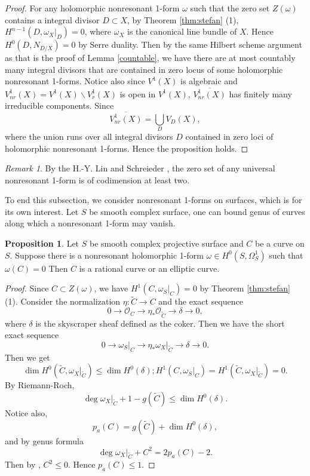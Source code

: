 \documentclass[a4paper,12pt,reqno]{amsart}
\theoremstyle{plain}
\theoremstyle{definition}
\newtheorem{proposition}[theorem]{Proposition}
\theoremstyle{remark}
\newtheorem{remark}[theorem]{Remark}
\begin{document}
 \begin{proof}
For any holomorphic nonresonant 1-form $\omega$ such that the zero set $Z(\omega)$ contains a integral divisor $D\subset X$, by Theorem \ref{thm:stefan} (1), $H^{n-1}(D, {\omega_X}|_D)=0$, where $\omega_X$ is the canonical line bundle of $X$. Hence $H^0(D, N_{D/X})=0$ by Serre duality. Then by the same Hilbert scheme argument as that is the proof of   Lemma \ref{countable}, we have there are at most countably many integral divisors that are contained in zero locus of some holomorphic nonresonant 1-forms.  Notice also since $V^1(X)$ is algebraic and $V^1_{nr}(X)=V^1(X)\backslash V_r^1(X)$ is open in $V^1(X)$, $\overline{V_{nr}^1(X)}$ has finitely many irreducible components. Since $$\overline{V_{nr}^1(X)}=\bigcup_{D}V_D(X),$$ where the union runs over all integral divisors $D$ contained in zero loci of holomorphic nonresonant 1-forms. Hence the proposition holds.
 \end{proof}
 
 \begin{remark}
By the H.-Y. Lin and Schreieder \cite[appendix]{SS19}, the zero set of any universal nonresonant 1-form is of codimension at least two. 
 \end{remark}

 To end this subsection, we consider nonresonant 1-forms on surfaces, which is for its own interest. Let $S$ be smooth complex surface, one can bound genus of curves along which a nonresonant 1-form may vanish.
 
 \begin{proposition}
 Let $S$ be smooth complex projective surface and $C$ be a curve on $S$. Suppose there is a nonresonant holomorphic 1-form $\omega\in H^0(S, \Omega_S^1)$ such that $\omega(C)=0$ Then $C$ is a rational curve or an elliptic curve.
 \end{proposition}
 
 
 \begin{proof}
 Since $C\subset Z(\omega)$, we have $H^1(C, {\omega_S}|_C)=0$ by Theorem \ref{thm:stefan} (1). Consider the normalization $\eta: \widetilde{C}\to C$ and the exact sequence $$0\to \mathcal{O}_C\to \eta_*\mathcal{O}_{\widetilde{C}}\to \delta\to 0, $$ where $\delta$ is the skyscraper sheaf defined as the coker. Then we have the short exact sequence $$0\to {\omega_S}|_C\to \eta_*{{\omega_X}|_{\widetilde{C}}}\to \delta\to 0.$$ Then we get $$\dim H^0(\widetilde{C}, {\omega_X}|_{\widetilde{C}})\leq \dim H^0(\delta);   H^1(C, {\omega_S}|_C)=H^1(\widetilde{C}, {\omega_X}|_{\widetilde{C}})=0.$$ By Riemann-Roch, $$\deg {\omega_X}|_{\widetilde{C}}+1-g(\widetilde{C})\leq \dim H^0(\delta).$$ Notice also, $$p_a(C)=g(\widetilde{C})+\dim H^0(\delta), $$ and by genus formula $$\deg {\omega_X}|_{\widetilde{C}}+C^2=2p_a(C)-2.$$ Then by \cite[Theorem 1]{Sp88}, $C^2\leq 0$. Hence $p_a(C)\leq1$.
 \end{proof}
 
\end{document}
